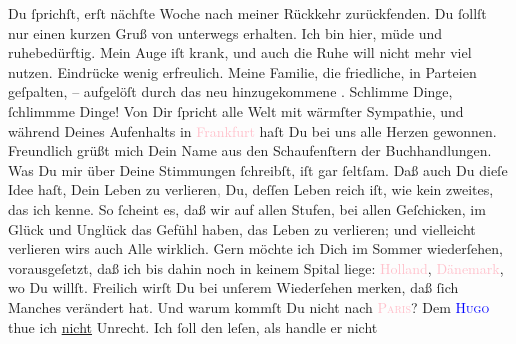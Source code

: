                Du ſprichſt, erſt nächſte Woche nach meiner Rückkehr zurückfenden.\pend
           \pstart
           Du ſollſt nur einen kurzen Gruß von unterwegs erhalten. Ich bin hier, müde und
               ruhebedürftig. Mein  Auge iſt krank, und \strikeout{\textcolor{gray}{×}} auch die Ruhe will nicht mehr viel nutzen. \label{T_L02771-4v}\label{T_L02771-4h} Eindrücke wenig erfreulich. Meine
               Familie, die {\pb}friedliche, in  Parteien geſpalten, – aufgelöſt durch das neu hinzugekommene \label{K_L02771-1v}\label{K_L02771-1h}.
               Schlimme Dinge, ſchlimmme Dinge! \pend
           \pstart
           Von Dir ſpricht alle Welt mit wärmſter Sympathie, und während Deines Aufenhalts in
                  \textcolor{pink}{Frankfurt}{}\ledrightnote{\textcolor{pink}{Frankfurt am Main}} haſt Du bei uns alle Herzen
               gewonnen. Freundlich grüßt mich Dein Name aus den Schaufenſtern der
               Buchhandlungen.\pend
           \pstart
           Was Du mir über Deine Stimmungen ſchreibſt, iſt gar ſeltſam. Daß auch Du dieſe Idee
               haſt, Dein Leben zu verlieren\textcolor{gray}{,}{ }{\pb}Du, deſſen Leben reich iſt, wie kein zweites, das
               ich kenne. So ſcheint es, daß \strikeout{\textcolor{gray}{×}} wir auf allen Stufen, bei allen Geſchicken, im Glück und Unglück das Gefühl
               haben, das Leben zu verlieren; und vielleicht verlieren wirs auch Alle wirklich.\pend
           \pstart
           Gern möchte ich Dich im Sommer wiederſehen, vorausgeſetzt, daß ich bis dahin noch in
               keinem Spital liege: \textcolor{pink}{Holland}{}\ledrightnote{\textcolor{pink}{Niederlande}}, \textcolor{pink}{Dänemark}{}\ledrightnote{\textcolor{pink}{Dänemark}}, wo Du willſt. Freilich wirſt Du bei unſerem
               Wiederſehen {\pb}merken, daß ſich Manches verändert
               hat.\pend
           \pstart
           Und warum kommſt Du nicht nach \textsc{\textcolor{pink}{Paris}{}\ledrightnote{\textcolor{pink}{Paris}}}? \pend
           \pstart
           Dem \textsc{\textcolor{blue}{Hugo}{}\ledrightnote{\textcolor{blue}{Hugo von Hofmannsthal}}} thue ich \uline{nicht} Unrecht. Ich ſoll den \label{K_L02771-66v}\label{K_L02771-66h} leſen, als handle er nicht
